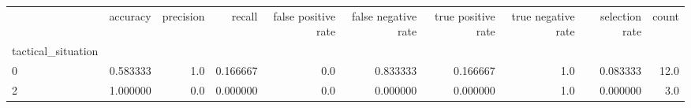 \begin{tabular}{lrrrrrrrrr}
\toprule
{} &  accuracy &  precision &    recall &  false positive rate &  false negative rate &  true positive rate &  true negative rate &  selection rate &  count \\
tactical\_situation &           &            &           &                      &                      &                     &                     &                 &        \\
\midrule
0                  &  0.583333 &        1.0 &  0.166667 &                  0.0 &             0.833333 &            0.166667 &                 1.0 &        0.083333 &   12.0 \\
2                  &  1.000000 &        0.0 &  0.000000 &                  0.0 &             0.000000 &            0.000000 &                 1.0 &        0.000000 &    3.0 \\
\bottomrule
\end{tabular}
